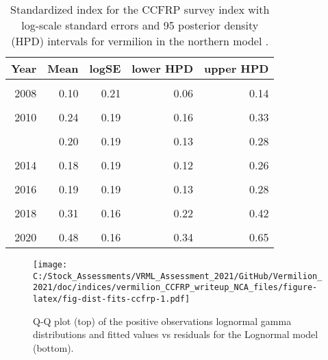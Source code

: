 \documentclass[
]{article}
\begin{document}
\begin{table}

\caption{\label{tab:tab-index-ccfrp}Standardized index for the CCFRP survey index with log-scale standard errors and 95%
       posterior density (HPD) intervals for vermilion in the northern model .}
\centering
\begin{tabular}[t]{rrrrr}
\toprule
Year & Mean & logSE & lower HPD & upper HPD\\
\midrule
\cellcolor{gray!6}{2007} & \cellcolor{gray!6}{0.12} & \cellcolor{gray!6}{0.22} & \cellcolor{gray!6}{0.08} & \cellcolor{gray!6}{0.19}\\
2008 & 0.10 & 0.21 & 0.06 & 0.14\\
\cellcolor{gray!6}{2009} & \cellcolor{gray!6}{0.17} & \cellcolor{gray!6}{0.21} & \cellcolor{gray!6}{0.11} & \cellcolor{gray!6}{0.24}\\
2010 & 0.24 & 0.19 & 0.16 & 0.33\\
\cellcolor{gray!6}{2011} & \cellcolor{gray!6}{0.19} & \cellcolor{gray!6}{0.20} & \cellcolor{gray!6}{0.13} & \cellcolor{gray!6}{0.28}\\
\addlinespace
2012 & 0.20 & 0.19 & 0.13 & 0.28\\
\cellcolor{gray!6}{2013} & \cellcolor{gray!6}{0.10} & \cellcolor{gray!6}{0.22} & \cellcolor{gray!6}{0.06} & \cellcolor{gray!6}{0.15}\\
2014 & 0.18 & 0.19 & 0.12 & 0.26\\
\cellcolor{gray!6}{2015} & \cellcolor{gray!6}{0.26} & \cellcolor{gray!6}{0.20} & \cellcolor{gray!6}{0.17} & \cellcolor{gray!6}{0.38}\\
2016 & 0.19 & 0.19 & 0.13 & 0.28\\
\addlinespace
\cellcolor{gray!6}{2017} & \cellcolor{gray!6}{0.22} & \cellcolor{gray!6}{0.17} & \cellcolor{gray!6}{0.16} & \cellcolor{gray!6}{0.30}\\
2018 & 0.31 & 0.16 & 0.22 & 0.42\\
\cellcolor{gray!6}{2019} & \cellcolor{gray!6}{0.36} & \cellcolor{gray!6}{0.16} & \cellcolor{gray!6}{0.26} & \cellcolor{gray!6}{0.48}\\
2020 & 0.48 & 0.16 & 0.34 & 0.65\\
\bottomrule
\end{tabular}
\end{table}

\FloatBarrier

\begin{figure}
\centering
\texttt{[image: C:/Stock\_Assessments/VRML\_Assessment\_2021/GitHub/Vermilion\_2021/doc/indices/vermilion\_CCFRP\_writeup\_NCA\_files/figure-latex/fig-dist-fits-ccfrp-1.pdf]}
\caption{\label{fig:fig-dist-fits-ccfrp}Q-Q plot (top) of the positive observations lognormal gamma distributions and fitted values vs residuals for the Lognormal model (bottom).}
\end{figure}
\end{document}
